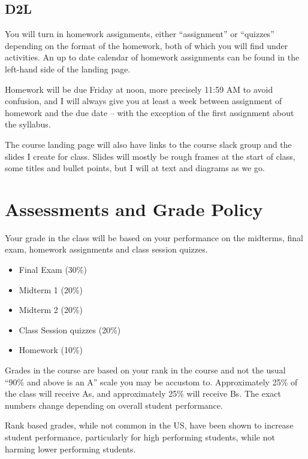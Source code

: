 \documentclass[
]{article}
\providecommand{\tightlist}{%
  \setlength{\itemsep}{0pt}\setlength{\parskip}{0pt}}
\begin{document}
\hypertarget{d2l}{%
\subsection{D2L}\label{d2l}}

You will turn in homework assignments, either ``assignment'' or
``quizzes'' depending on the format of the homework, both of which you
will find under activities. An up to date calendar of homework
assignments can be found in the left-hand side of the landing page.

Homework will be due Friday at noon, more precisely 11:59 AM to avoid
confusion, and I will always give you at least a week between assignment
of homework and the due date -- with the exception of the first
assignment about the syllabus.

The course landing page will also have links to the course slack group
and the slides I create for class. Slides will mostly be rough frames at
the start of class, some titles and bullet points, but I will at text
and diagrams as we go.

\hypertarget{assessments-and-grade-policy}{%
\section{Assessments and Grade
Policy}\label{assessments-and-grade-policy}}

Your grade in the class will be based on your performance on the
midterms, final exam, homework assignments and class session quizzes.

\begin{itemize}
\tightlist
\item
  Final Exam (30\%)
\item
  Midterm 1 (20\%)
\item
  Midterm 2 (20\%)
\item
  Class Session quizzes (20\%)
\item
  Homework (10\%)
\end{itemize}

Grades in the course are based on your rank in the course and not the
usual ``90\% and above is an A'' scale you may be accustom to.
Approximately 25\% of the class will receive As, and approximately 25\%
will receive Bs. The exact numbers change depending on overall student
performance.

Rank based grades, while not common in the US, have been shown to
increase student performance, particularly for high performing students,
while not harming lower performing students.
\end{document}
